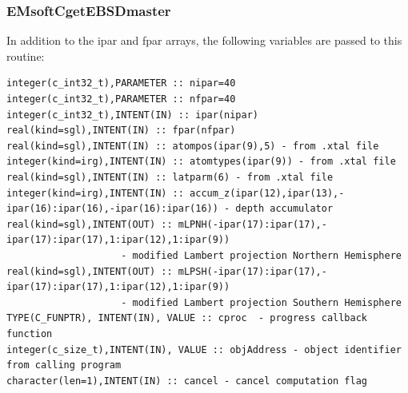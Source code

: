 \documentclass[DIV=calc, paper=letter, fontsize=11pt]{scrartcl}	 %
\begin{document}
\subsubsection{EMsoftCgetEBSDmaster}
In addition to the \textsf{ipar} and \textsf{fpar} arrays, the following variables are 
passed to this routine:
{\footnotesize\begin{verbatim}
integer(c_int32_t),PARAMETER :: nipar=40
integer(c_int32_t),PARAMETER :: nfpar=40
integer(c_int32_t),INTENT(IN) :: ipar(nipar)
real(kind=sgl),INTENT(IN) :: fpar(nfpar)
real(kind=sgl),INTENT(IN) :: atompos(ipar(9),5) - from .xtal file
integer(kind=irg),INTENT(IN) :: atomtypes(ipar(9)) - from .xtal file
real(kind=sgl),INTENT(IN) :: latparm(6) - from .xtal file
integer(kind=irg),INTENT(IN) :: accum_z(ipar(12),ipar(13),-ipar(16):ipar(16),-ipar(16):ipar(16)) - depth accumulator
real(kind=sgl),INTENT(OUT) :: mLPNH(-ipar(17):ipar(17),-ipar(17):ipar(17),1:ipar(12),1:ipar(9)) 
					- modified Lambert projection Northern Hemisphere
real(kind=sgl),INTENT(OUT) :: mLPSH(-ipar(17):ipar(17),-ipar(17):ipar(17),1:ipar(12),1:ipar(9))
					- modified Lambert projection Southern Hemisphere
TYPE(C_FUNPTR), INTENT(IN), VALUE :: cproc  - progress callback function
integer(c_size_t),INTENT(IN), VALUE :: objAddress - object identifier from calling program
character(len=1),INTENT(IN) :: cancel - cancel computation flag
\end{verbatim}}
\end{document}
